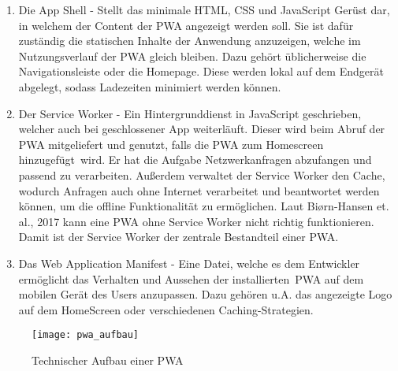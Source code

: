 \begin{enumerate}
	\item Die App Shell - Stellt das minimale \ac{HTML}, \ac{CSS} und JavaScript Gerüst dar, in welchem der Content der \ac{PWA} angezeigt werden soll. Sie ist dafür zuständig die statischen Inhalte der Anwendung anzuzeigen, welche im Nutzungsverlauf der \ac{PWA} gleich bleiben. Dazu gehört üblicherweise die Navigationsleiste oder die Homepage. Diese werden lokal auf dem Endgerät abgelegt, sodass Ladezeiten minimiert werden können.
	
	\item Der Service Worker - Ein Hintergrunddienst in JavaScript geschrieben, welcher auch bei geschlossener App weiterläuft. Dieser wird beim Abruf der \ac{PWA} mitgeliefert und genutzt, falls die \ac{PWA} \glqq zum Homescreen hinzugefügt\grqq\ wird. Er hat die Aufgabe Netzwerkanfragen abzufangen und passend zu verarbeiten. Außerdem verwaltet der Service Worker den Cache, wodurch Anfragen auch ohne Internet verarbeitet und beantwortet werden können, um die offline Funktionalität zu ermöglichen. Laut Biørn-Hansen et. al., 2017\cite{hansen_pwa} kann eine \ac{PWA} ohne Service Worker nicht richtig funktionieren. Damit ist der Service Worker der zentrale Bestandteil einer \ac{PWA}. 
	
	\item Das Web Application Manifest - 
	Eine Datei, welche es dem Entwickler ermöglicht das Verhalten und Aussehen der \glqq installierten\grqq\ \ac{PWA} auf dem mobilen Gerät des Users anzupassen. Dazu gehören u.A. das angezeigte Logo auf dem HomeScreen oder verschiedenen Caching-Strategien.
	
\end{enumerate}

\begin{figure}[!ht]
	\texttt{[image: pwa\_aufbau]}
	\centering
	\caption[Technischer Aufbau einer \ac{PWA}]{Technischer Aufbau einer \ac{PWA} \cite{adetunji_pwa}}
\end{figure}


